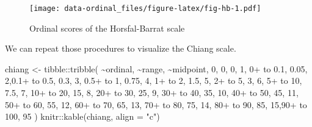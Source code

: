 \documentclass[
  letterpaper,
]{book}
\newenvironment{Shaded}{\begin{snugshade}}{\end{snugshade}}
\newcommand{\AttributeTok}[1]{\textcolor[rgb]{0.40,0.45,0.13}{#1}}
\newcommand{\DecValTok}[1]{\textcolor[rgb]{0.68,0.00,0.00}{#1}}
\newcommand{\FloatTok}[1]{\textcolor[rgb]{0.68,0.00,0.00}{#1}}
\newcommand{\FunctionTok}[1]{\textcolor[rgb]{0.28,0.35,0.67}{#1}}
\newcommand{\NormalTok}[1]{\textcolor[rgb]{0.00,0.23,0.31}{#1}}
\newcommand{\OtherTok}[1]{\textcolor[rgb]{0.00,0.23,0.31}{#1}}
\newcommand{\SpecialCharTok}[1]{\textcolor[rgb]{0.37,0.37,0.37}{#1}}
\newcommand{\StringTok}[1]{\textcolor[rgb]{0.13,0.47,0.30}{#1}}
\begin{document}
\begin{figure}

\texttt{[image: data-ordinal\_files/figure-latex/fig-hb-1.pdf]} \hfill{}

\caption{\label{fig-hb}Ordinal scores of the Horsfal-Barrat scale}

\end{figure}

We can repeat those procedures to visualize the Chiang scale.

\begin{Shaded}
\begin{Highlighting}[]
\NormalTok{chiang }\OtherTok{\textless{}{-}}\NormalTok{ tibble}\SpecialCharTok{::}\FunctionTok{tribble}\NormalTok{(}
  \SpecialCharTok{\textasciitilde{}}\NormalTok{ordinal, }\SpecialCharTok{\textasciitilde{}}\StringTok{\textquotesingle{}range\textquotesingle{}}\NormalTok{, }\SpecialCharTok{\textasciitilde{}}\NormalTok{midpoint,}
  \DecValTok{0}\NormalTok{,          }\StringTok{\textquotesingle{}0\textquotesingle{}}\NormalTok{,     }\DecValTok{0}\NormalTok{,   }
  \DecValTok{1}\NormalTok{,  }\StringTok{\textquotesingle{}0+ to 0.1\textquotesingle{}}\NormalTok{,  }\FloatTok{0.05}\NormalTok{,   }
  \DecValTok{2}\NormalTok{,}\StringTok{\textquotesingle{}0.1+ to 0.5\textquotesingle{}}\NormalTok{,   }\FloatTok{0.3}\NormalTok{,   }
  \DecValTok{3}\NormalTok{,  }\StringTok{\textquotesingle{}0.5+ to 1\textquotesingle{}}\NormalTok{,  }\FloatTok{0.75}\NormalTok{,  }
  \DecValTok{4}\NormalTok{,    }\StringTok{\textquotesingle{}1+ to 2\textquotesingle{}}\NormalTok{,   }\FloatTok{1.5}\NormalTok{, }
  \DecValTok{5}\NormalTok{,    }\StringTok{\textquotesingle{}2+ to 5\textquotesingle{}}\NormalTok{,     }\DecValTok{3}\NormalTok{, }
  \DecValTok{6}\NormalTok{,   }\StringTok{\textquotesingle{}5+ to 10\textquotesingle{}}\NormalTok{,   }\FloatTok{7.5}\NormalTok{, }
  \DecValTok{7}\NormalTok{,  }\StringTok{\textquotesingle{}10+ to 20\textquotesingle{}}\NormalTok{,    }\DecValTok{15}\NormalTok{, }
  \DecValTok{8}\NormalTok{,  }\StringTok{\textquotesingle{}20+ to 30\textquotesingle{}}\NormalTok{,    }\DecValTok{25}\NormalTok{, }
  \DecValTok{9}\NormalTok{,  }\StringTok{\textquotesingle{}30+ to 40\textquotesingle{}}\NormalTok{,    }\DecValTok{35}\NormalTok{, }
  \DecValTok{10}\NormalTok{, }\StringTok{\textquotesingle{}40+ to 50\textquotesingle{}}\NormalTok{,    }\DecValTok{45}\NormalTok{,  }
  \DecValTok{11}\NormalTok{, }\StringTok{\textquotesingle{}50+ to 60\textquotesingle{}}\NormalTok{,    }\DecValTok{55}\NormalTok{,}
  \DecValTok{12}\NormalTok{, }\StringTok{\textquotesingle{}60+ to 70\textquotesingle{}}\NormalTok{,    }\DecValTok{65}\NormalTok{,}
  \DecValTok{13}\NormalTok{, }\StringTok{\textquotesingle{}70+ to 80\textquotesingle{}}\NormalTok{,    }\DecValTok{75}\NormalTok{,}
  \DecValTok{14}\NormalTok{, }\StringTok{\textquotesingle{}80+ to 90\textquotesingle{}}\NormalTok{,    }\DecValTok{85}\NormalTok{,}
  \DecValTok{15}\NormalTok{,}\StringTok{\textquotesingle{}90+ to 100\textquotesingle{}}\NormalTok{,   }\DecValTok{95}
\NormalTok{  )}
\NormalTok{knitr}\SpecialCharTok{::}\FunctionTok{kable}\NormalTok{(chiang, }\AttributeTok{align =} \StringTok{"c"}\NormalTok{)}
\end{Highlighting}
\end{Shaded}
\end{document}
